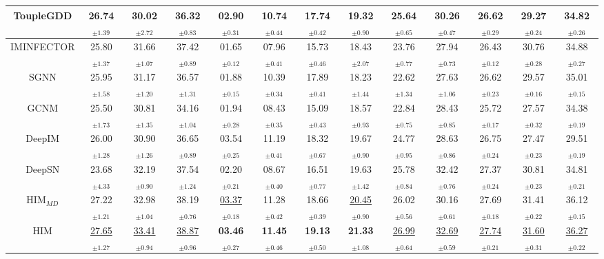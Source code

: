 \begin{table*}[!ht]
\begin{center}
{\begin{tabular}{c ccc ccc ccc ccc }
ToupleGDD
    & 26.74$_{\pm1.39}$ & 30.02$_{\pm2.72}$ & 36.32$_{\pm0.83}$ 
    & 02.90$_{\pm0.31}$ & 10.74$_{\pm0.44}$ & 17.74$_{\pm0.42}$ 
    & 19.32$_{\pm0.90}$ & 25.64$_{\pm0.65}$ & 30.26$_{\pm0.47}$ 
    & 26.62$_{\pm0.29}$ & 29.27$_{\pm0.24}$ & 34.82$_{\pm0.26}$ \\

\midrule

IMINFECTOR
    & 25.80$_{\pm1.37}$ & 31.66$_{\pm1.07}$ & 37.42$_{\pm0.89}$ 
    & 01.65$_{\pm0.12}$ & 07.96$_{\pm0.41}$ & 15.73$_{\pm0.46}$ 
    & 18.43$_{\pm2.07}$ & 23.76$_{\pm0.77}$ & 27.94$_{\pm0.73}$ 
    & 26.43$_{\pm0.12}$ & 30.76$_{\pm0.28}$ & 34.88$_{\pm0.27}$ \\

SGNN
    & 25.95$_{\pm1.58}$ & 31.17$_{\pm1.20}$ & 36.57$_{\pm1.31}$ 
    & 01.88$_{\pm0.15}$ & 10.39$_{\pm0.34}$ & 17.89$_{\pm0.41}$ 
    & 18.23$_{\pm1.44}$ & 22.62$_{\pm1.34}$ & 27.63$_{\pm1.06}$ 
    & 26.62$_{\pm0.23}$ & 29.57$_{\pm0.16}$ & 35.01$_{\pm0.15}$ \\

GCNM
    & 25.50$_{\pm1.73}$ & 30.81$_{\pm1.35}$ & 34.16$_{\pm1.04}$ 
    & 01.94$_{\pm0.28}$ & 08.43$_{\pm0.35}$ & 15.09$_{\pm0.43}$ 
    & 18.57$_{\pm0.93}$ & 22.84$_{\pm0.75}$ & 28.43$_{\pm0.85}$ 
    & 25.72$_{\pm0.17}$ & 27.57$_{\pm0.32}$ & 34.38$_{\pm0.19}$ \\
    
DeepIM
    & 26.00$_{\pm1.28}$ & 30.90$_{\pm1.26}$ & 36.65$_{\pm0.89}$ 
    & 03.54$_{\pm0.25}$ & 11.19$_{\pm0.41}$ & 18.32$_{\pm0.67}$ 
    & 19.67$_{\pm0.90}$ & 24.77$_{\pm0.95}$ & 28.63$_{\pm0.86}$ 
    & 26.75$_{\pm0.24}$ & 27.47$_{\pm0.23}$ & 29.51$_{\pm0.19}$ \\

DeepSN
    & 23.68$_{\pm4.33}$ & 32.19$_{\pm0.90}$ & 37.54$_{\pm1.24}$ 
    & 02.20$_{\pm0.21}$ & 08.67$_{\pm0.40}$ & 16.51$_{\pm0.77}$ 
    & 19.63$_{\pm1.42}$ & 25.78$_{\pm0.84}$ & 32.42$_{\pm0.76}$ 
    & 27.37$_{\pm0.24}$ & 30.81$_{\pm0.23}$ & 34.81$_{\pm0.21}$ \\
    
\midrule
HIM$_{MD}$
    & 27.22$_{\pm1.21}$ & 32.98$_{\pm1.04}$ & 38.19$_{\pm0.76}$ 
    & \underline{03.37}$_{\pm0.18}$ & 11.28$_{\pm0.42}$ & 18.66$_{\pm0.39}$ 
    & \underline{20.45}$_{\pm0.90}$ & 26.02$_{\pm0.56}$ & 30.16$_{\pm0.61}$ 
    & 27.69$_{\pm0.18}$ & 31.41$_{\pm0.22}$ & 36.12$_{\pm0.15}$ \\  

HIM
    & \underline{27.65}$_{\pm1.27}$ & \underline{33.41}$_{\pm0.94}$ & \underline{38.87}$_{\pm0.96}$
    & \textbf{03.46}$_{\pm0.27}$ & \textbf{11.45}$_{\pm0.46}$ & \textbf{19.13}$_{\pm0.50}$ 
    & \textbf{21.33}$_{\pm1.08}$ & \underline{26.99}$_{\pm0.64}$ & \underline{32.69}$_{\pm0.59}$ 
    & \underline{27.74}$_{\pm0.21}$ & \underline{31.60}$_{\pm0.31}$ & \underline{36.27}$_{\pm0.22}$ \\

\bottomrule
\end{tabular}}
\label{table:result-ic}
\end{center}
\end{table*}